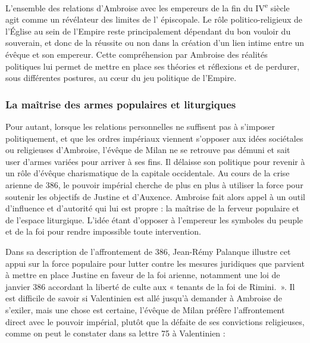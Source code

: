 \bigskip

L'ensemble des relations d'Ambroise avec les empereurs de la fin du IV\textsuperscript{e} siècle agit comme un révélateur des limites de l' épiscopale. Le rôle politico-religieux de l'Église au sein de l'Empire reste principalement dépendant du bon vouloir du souverain, et donc de la réussite ou non dans la création d'un lien intime entre un évêque et son empereur. Cette compréhension par Ambroise des réalités politiques lui permet de mettre en place ses théories et réflexions et de perdurer, sous différentes postures, au cœur du jeu politique de l'Empire.

\bigskip

\subsubsection{La maîtrise des armes populaires et liturgiques}

Pour autant, lorsque les relations personnelles ne suffisent pas à s'imposer politiquement, et que les ordres impériaux viennent s'opposer aux idées sociétales ou religieuses d'Ambroise, l'évêque de Milan ne se retrouve pas démuni et sait user d'armes variées pour arriver à ses fins. Il délaisse son  politique pour revenir à un rôle d'évêque charismatique de la capitale occidentale. Au cours de la crise arienne de 386, le pouvoir impérial cherche de plus en plus à utiliser la force pour soutenir les objectifs de Justine et d'Auxence. Ambroise fait alors appel à un outil d'influence et d'autorité qui lui est propre : la maîtrise de la ferveur populaire et de l'espace liturgique. L'idée étant d'opposer à l'empereur les symboles du peuple et de la foi pour rendre impossible toute intervention.

\bigskip

Dans sa description de l'affrontement de 386, Jean-Rémy Palanque illustre cet appui sur la force populaire pour lutter contre les mesures juridiques que parvient à mettre en place Justine en faveur de la foi arienne, notamment une loi de janvier 386 accordant la liberté de culte aux « tenants de la foi de Rimini\autocite[150]{palanque_ambroise}.~». Il est difficile de savoir si Valentinien est allé jusqu'à demander à Ambroise de s'exiler, mais une chose est certaine, l'évêque de Milan préfère l'affrontement direct avec le pouvoir impérial, plutôt que la défaite de ses convictions religieuses, comme on peut le constater dans sa lettre 75 à Valentinien :

